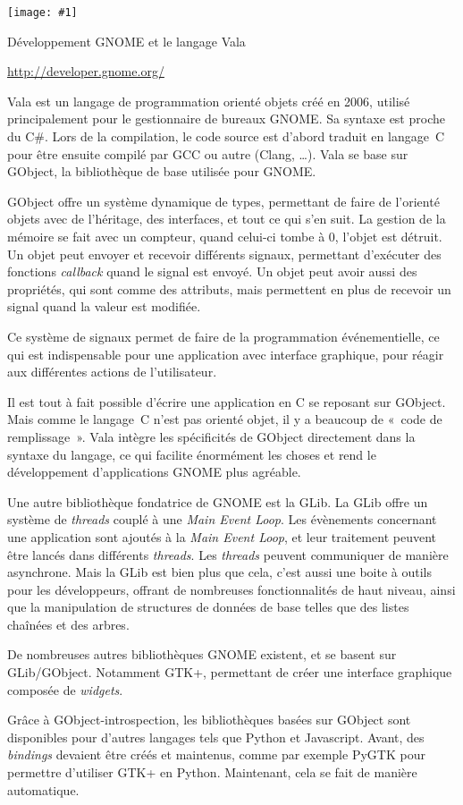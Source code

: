\documentclass[a5paper,11pt]{article}
\def\titre#1#2{
  \noindent
  \begin{minipage}{0.14\linewidth}
  \texttt{[image: \#1]}
  \end{minipage}
  \begin{minipage}{0.85\linewidth}
    {\LARGE #2}

    \begin{flushright}
      \url{http://developer.gnome.org/}
    \end{flushright}
  \end{minipage}

  \vspace{0.5cm}
}
\begin{document}
\titre{gnome-logo.pdf}{Développement GNOME et le langage Vala}

Vala est un langage de programmation orienté objets créé en 2006, utilisé principalement pour le gestionnaire de bureaux GNOME. Sa syntaxe est proche du C\#. Lors de la compilation, le code source est d'abord traduit en langage~C pour être ensuite compilé par GCC ou autre (Clang, …). Vala se base sur GObject, la bibliothèque de base utilisée pour GNOME.

GObject offre un système dynamique de types, permettant de faire de l'orienté objets avec de l'héritage, des interfaces, et tout ce qui s'en suit. La gestion de la mémoire se fait avec un compteur, quand celui-ci tombe à 0, l'objet est détruit. Un objet peut envoyer et recevoir différents signaux, permettant d'exécuter des fonctions \textit{callback} quand le signal est envoyé. Un objet peut avoir aussi des propriétés, qui sont comme des attributs, mais permettent en plus de recevoir un signal quand la valeur est modifiée.

Ce système de signaux permet de faire de la programmation événementielle, ce qui est indispensable pour une application avec interface graphique, pour réagir aux différentes actions de l'utilisateur.

Il est tout à fait possible d'écrire une application en C se reposant sur GObject. Mais comme le langage~C n'est pas orienté objet, il y a beaucoup de «~code de remplissage~». Vala intègre les spécificités de GObject directement dans la syntaxe du langage, ce qui facilite énormément les choses et rend le développement d'applications GNOME plus agréable.

Une autre bibliothèque fondatrice de GNOME est la GLib. La GLib offre un système de \textit{threads} couplé à une \textit{Main Event Loop}. Les évènements concernant une application sont ajoutés à la \textit{Main Event Loop}, et leur traitement peuvent être lancés dans différents \textit{threads}. Les \textit{threads} peuvent communiquer de manière asynchrone. Mais la GLib est bien plus que cela, c'est aussi une boite à outils pour les développeurs, offrant de nombreuses fonctionnalités de haut niveau, ainsi que la manipulation de structures de données de base telles que des listes chaînées et des arbres.

De nombreuses autres bibliothèques GNOME existent, et se basent sur GLib/GObject. Notamment GTK+, permettant de créer une interface graphique composée de \textit{widgets}.

Grâce à GObject-introspection, les bibliothèques basées sur GObject sont disponibles pour d'autres langages tels que Python et Javascript. Avant, des \textit{bindings} devaient être créés et maintenus, comme par exemple PyGTK pour permettre d'utiliser GTK+ en Python. Maintenant, cela se fait de manière automatique.
\end{document}

